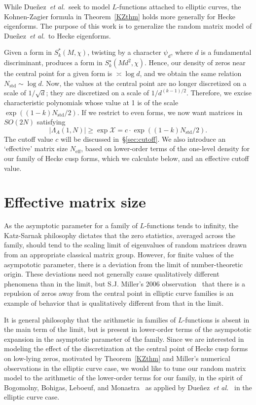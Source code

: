 \documentclass[11pt,reqno]{amsart} \usepackage{fullpage}
\renewcommand{\geq}{\geqslant}
\newcommand\be{\begin{equation}}
\newcommand\ee{\end{equation}}
\newcommand{\etal}{\textit{et al.}}
\newcommand{\nstd}{N_{\text{std}}}
\newcommand{\neff}{N_{\text{eff}}}
\numberwithin{equation}{section}
\begin{document}
While Dueñez~\etal\ seek to model $L$-functions attached to elliptic curves, the
Kohnen-Zagier formula in Theorem~\ref{KZthm} holds more generally for Hecke eigenforms.
The purpose of this work is to generalize the random matrix model of Dueñez~\etal\ to
Hecke eigenforms.

Given a form in $S_k^\ast(M,\chi)$, twisting by a character $\psi_d$,
where $d$ is a fundamental discriminant, produces a form in
$S_k^\star(Md^2,\chi)$. Hence, our density of zeros near the central point for a given
form is $\asymp \log d$, and we obtain the same relation
$\nstd\sim\log d$. Now, the values at the central point are no longer
discretized on a scale of $1/\sqrt d$; they are discretized on a scale of
$1/d^{(k-1)/2}$. Therefore, we excise characteristic polynomials whose value at 1 is of the
scale $\exp((1-k)\nstd/2)$. If we restrict to even forms, we now want
matrices in $SO(2N)$ satisfying
\be\label{eq:exciseddef} |\Lambda_A(1,N)|\geq \exp \mathcal X = c \cdot\exp((1-k)\nstd/2). \ee
The cutoff value $c$ will be discussed in~\S\ref{sec:cutoff}.
We also introduce an `effective' matrix size
$\neff$, based on lower-order terms of the one-level density for our family of Hecke cusp
forms, which we calculate below, and an effective cutoff value.

\section{Effective matrix size}\label{sec:neff}
As the asymptotic parameter for a family of $L$-functions tends to infinity, the
Katz-Sarnak philosophy dictates that the zero statistics, averaged across the family,
should tend to the scaling limit of eigenvalues of random matrices drawn from an
appropriate classical matrix group. However, for finite values of the asympototic
parameter, there is a deviation from the limit of number-theoretic origin.
These deviations need not generally cause qualitatively different phenomena than in the
limit, but S.J. Miller's 2006 observation~\cite{mil06} that there is a repulsion of zeros
away from the central point in elliptic curve families is an example of behavior that is
qualitatively different from that in the limit.

It is general philosophy that the arithmetic in families of $L$-functions is
absent in the main term of the limit, but is present in lower-order terms of the asympototic
expansion in the asymptotic parameter of the family. Since we are interested in modeling
the effect of the discretization at the central point of Hecke cusp forms on low-lying
zeros, motivated by Theorem~\ref{KZthm} and Miller's numerical observations in the elliptic
curve case, we would like to tune our random matrix model to the arithmetic of the
lower-order terms for our family, in the spirit of Bogomolny, Bohigas, Leboeuf, and
Monastra~\cite{bblm} as applied by Dueñez~\etal~\cite{DHKMS} in the elliptic curve case.
\end{document}
